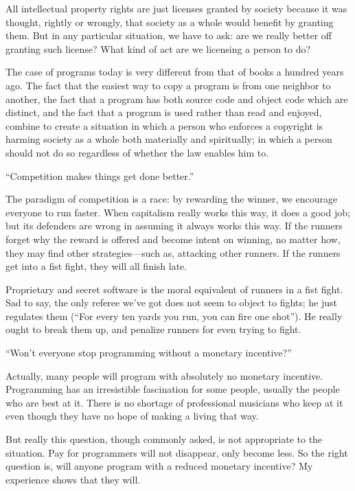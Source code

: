 All intellectual property rights are just licenses granted by society because it was thought, rightly or wrongly, that society as a whole would benefit by granting them. But in any particular situation, we have to ask: are we really better off granting such license? What kind of act are we licensing a person to do?

The case of programs today is very different from that of books a hundred years ago. The fact that the easiest way to copy a program is from one neighbor to another, the fact that a program has both source code and object code which are distinct, and the fact that a program is used rather than read and enjoyed, combine to create a situation in which a person who enforces a copyright is harming society as a whole both materially and spiritually; in which a person should not do so regardless of whether the law enables him to.

“Competition makes things get done better.”

The paradigm of competition is a race: by rewarding the winner, we encourage everyone to run faster. When capitalism really works this way, it does a good job; but its defenders are wrong in assuming it always works this way. If the runners forget why the reward is offered and become intent on winning, no matter how, they may find other strategies—such as, attacking other runners. If the runners get into a fist fight, they will all finish late.

Proprietary and secret software is the moral equivalent of runners in a fist fight. Sad to say, the only referee we've got does not seem to object to fights; he just regulates them (“For every ten yards you run, you can fire one shot”). He really ought to break them up, and penalize runners for even trying to fight.

“Won't everyone stop programming without a monetary incentive?”

Actually, many people will program with absolutely no monetary incentive. Programming has an irresistible fascination for some people, usually the people who are best at it. There is no shortage of professional musicians who keep at it even though they have no hope of making a living that way.

But really this question, though commonly asked, is not appropriate to the situation. Pay for programmers will not disappear, only become less. So the right question is, will anyone program with a reduced monetary incentive? My experience shows that they will.

